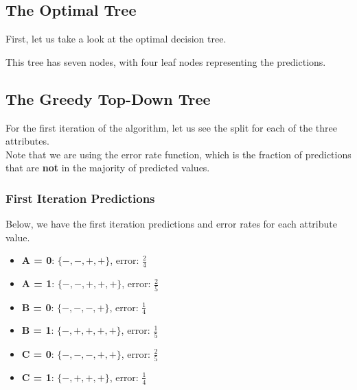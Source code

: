 \documentclass[11pt]{article}
\begin{document}
\subsection{The Optimal Tree}
First, let us take a look at the optimal decision tree.
\begin{center}
\end{center}
This tree has seven nodes, with four leaf nodes representing the predictions.
\subsection{The Greedy Top-Down Tree}
For the first iteration of the algorithm, let us see the split for each of the three attributes.\\
Note that we are using the error rate function, which is the fraction of predictions that are \textbf{not} in the majority of predicted values.\\

\subsubsection{First Iteration Predictions}
Below, we have the first iteration predictions and error rates for each attribute value.
\begin{itemize}
\item \textbf{A = 0}: $\{-, -, +, +\}$, error: $\frac{2}{4}$
\item \textbf{A = 1}: $\{-, -, +, +, +\}$, error: $\frac{2}{5}$
\item \textbf{B = 0}: $\{-, -, -, +\}$, error: $\frac{1}{4}$
\item \textbf{B = 1}: $\{-, +, +, +, +\}$, error: $\frac{1}{5}$
\item \textbf{C = 0}: $\{-, -, -, +, +\}$, error: $\frac{2}{5}$
\item \textbf{C = 1}: $\{-, +, +, +\}$, error: $\frac{1}{4}$
\end{itemize}
\end{document}
